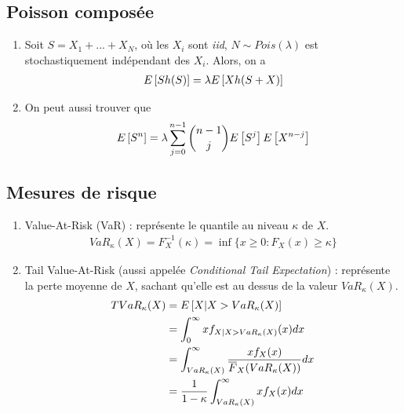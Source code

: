 \documentclass[10pt, french, landscape]{article}
\begin{document}
\begin{multicols*}{3}
\subsection*{Poisson composée}
\begin{enumerate}[label=\faAngleRight]
\item Soit $S = X_1 + ... + X_N$, où les $X_i$ sont \textit{iid}, $N \sim Pois(\lambda)$ est stochastiquement indépendant des $X_i$. Alors, on a
\begin{align*}
E \left[ S h(S) \right] = \lambda E \left[ X h(S+X) \right]
\end{align*}

\item On peut aussi trouver que
\begin{align*}
E \left[ S^n \right] = \lambda \sum_{j=0}^{n-1} \binom{n-1}{j} E \left[ S^j \right] E \left[ X^{n-j} \right]
\end{align*}
\end{enumerate}

\subsection*{Mesures de risque}
\begin{enumerate}[label=\faAngleRight]
\item Value-At-Risk (VaR) : représente le quantile au niveau $\kappa$ de $X$.
\begin{align*}
VaR_\kappa(X) = F_X^{-1}(\kappa) = \inf \{ x \geq 0 : F_X(x) \geq \kappa \}
\end{align*}

\item Tail Value-At-Risk (aussi appelée \textit{Conditional Tail Expectation})  : représente la perte moyenne de $X$, sachant qu'elle est au dessus de la valeur $VaR_\kappa(X)$.
\begin{align*}
TVaR_\kappa(X) & = E \left[ X | X > VaR_\kappa(X) \right] \\
	& = \int_{0}^{\infty} x f_{X | X > VaR_\kappa(X)}(x) dx \\
	& = \int_{VaR_\kappa(X)}^{\infty} \frac{x f_X(x)}{\overline{F}_X(VaR_\kappa(X))} dx \\
	& = \frac{1}{1 - \kappa} \int_{VaR_\kappa(X)}^{\infty} x f_X(x) dx \\
\end{align*}
\end{enumerate}

















\end{multicols*}
\end{document}
